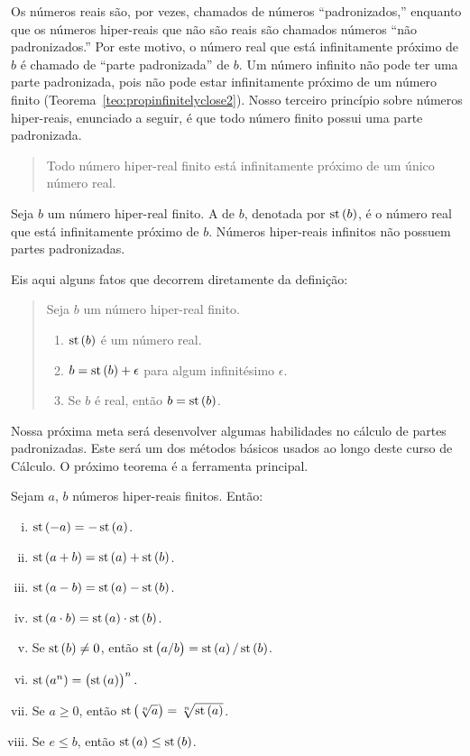 Os números reais são, por vezes, chamados de números ``padronizados,'' enquanto que os números hiper-reais que não são reais
são chamados números ``não padronizados.'' Por este motivo, o número real
que está infinitamente próximo de $b$ é chamado de ``parte padronizada'' de
$b$. Um número infinito não pode ter uma parte padronizada, pois não pode
estar infinitamente próximo de um número finito (Teorema~\ref{teo:propinfinitelyclose2}). Nosso terceiro princípio sobre números hiper-reais,
enunciado a seguir, é que todo número finito possui uma parte padronizada.


\begin{quote}
Todo número hiper-real finito está infinitamente próximo de um único
número real.
\end{quote}

\begin{defin}
Seja $b$ um número hiper-real finito. A
 de $b$,
denotada por $\operatorname{st}\left(b\right)$, é o número real que está infinitamente próximo de
$b$. Números hiper-reais infinitos não possuem partes padronizadas.
\end{defin}

Eis aqui alguns fatos que decorrem diretamente da definição:
\begin{quote}
Seja $b$ um número hiper-real finito.
\begin{enumerate}[(1)]
\item $\operatorname{st}\left(b\right)$ é um número real.
\item $b = \operatorname{st}\left(b\right) + \epsilon$ para algum infinitésimo $\epsilon$.
\item Se $b$ é real, então $b = \operatorname{st}\left(b\right)$.
\end{enumerate}
\end{quote}

Nossa próxima meta será desenvolver algumas habilidades no cálculo de partes
padronizadas. Este será um dos métodos básicos usados ao longo deste curso
de Cálculo. O próximo teorema é a ferramenta principal.

\begin{theorem}
\label{teo:stpartrules}
Sejam $a$, $b$ números hiper-reais finitos. Então:
\begin{enumerate}[(i)]
\item $\operatorname{st}\left(-a\right) = -\operatorname{st}\left(a\right)$.
\item $\operatorname{st}\left(a+b\right) = \operatorname{st}\left(a\right)+\operatorname{st}\left(b\right)$.
\item $\operatorname{st}\left(a-b\right) = \operatorname{st}\left(a\right)-\operatorname{st}\left(b\right)$.
\item\label{teo:stpartrules:iv} $\operatorname{st}\left(a \cdot b\right) = \operatorname{st}\left(a\right) \cdot \operatorname{st}\left(b\right)$.
\item Se $\operatorname{st}\left(b\right) \ne 0$, então $\operatorname{st}\left(a/b\right) = \operatorname{st}\left(a\right)/\operatorname{st}\left(b\right)$.
\item $\operatorname{st}\left(a^n\right) = \left(\operatorname{st}\left(a\right)\right)^n.$
\item Se $a \ge 0$, então $\operatorname{st}\left(\sqrt[n]{a}\right) = \sqrt[n]{\operatorname{st}\left(a\right)}$.
\item Se $e \le b$, então $\operatorname{st}\left(a\right) \le \operatorname{st}\left(b\right)$.
\end{enumerate}
\end{theorem}

